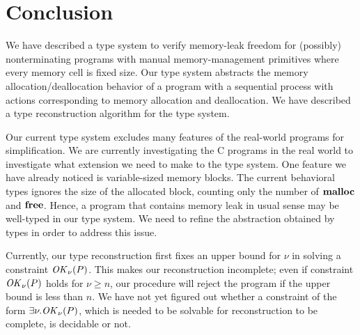 \section{Conclusion}\label{sec:conclusion}

We have described a type system to verify memory-leak freedom for
(possibly) nonterminating programs with manual memory-management
primitives where every memory cell is fixed size.  Our type system
abstracts the memory allocation/deallocation behavior of a program
with a sequential process with actions corresponding to memory
allocation and deallocation.  We have described a type reconstruction
algorithm for the type system.

Our current type system excludes many features of the real-world
programs for simplification.  We are currently investigating the C
programs in the real world to investigate what extension we need to
make to the type system.  One feature we have already noticed is
variable-sized memory blocks.  The current behavioral types ignores
the size of the allocated block, counting only the number of
\(\mathbf{malloc}\) and \(\mathbf{free}\).  Hence, a program that contains memory leak
in usual sense may be well-typed in our type system.  We need to
refine the abstraction obtained by types in order to address this
issue.

Currently, our type reconstruction first fixes an upper bound for
\(\nu\) in solving a constraint \(\mathit{OK}_\nu(P)\).  This makes our
reconstruction incomplete; even if constraint \(\mathit{OK}_\nu(P)\) holds for
\(\nu \ge n\), our procedure will reject the program if the upper
bound is less than \(n\).  We have not yet figured out whether a
constraint of the form \(\exists \nu. \mathit{OK}_\nu(P)\), which is needed to
be solvable for reconstruction to be complete, is decidable or not.


